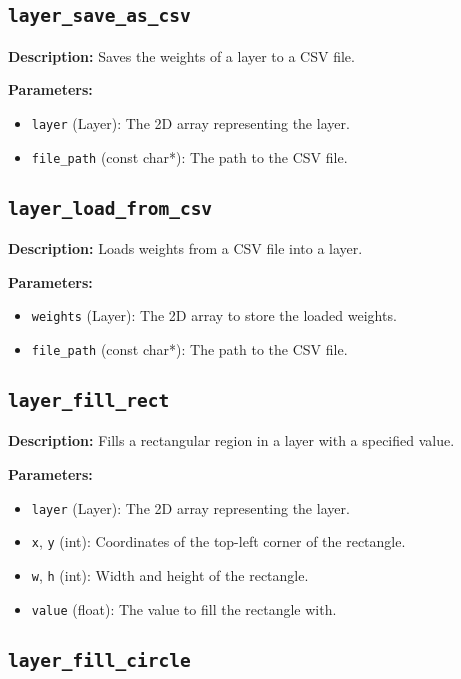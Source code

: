 \documentclass{article}
\begin{document}
\subsection*{\texttt{layer\_save\_as\_csv}}

\textbf{Description:} Saves the weights of a layer to a CSV file.

\textbf{Parameters:}
\begin{itemize}
    \item \texttt{layer} (Layer): The 2D array representing the layer.
    \item \texttt{file\_path} (const char*): The path to the CSV file.
\end{itemize}

\subsection*{\texttt{layer\_load\_from\_csv}}

\textbf{Description:} Loads weights from a CSV file into a layer.

\textbf{Parameters:}
\begin{itemize}
    \item \texttt{weights} (Layer): The 2D array to store the loaded weights.
    \item \texttt{file\_path} (const char*): The path to the CSV file.
\end{itemize}

\subsection*{\texttt{layer\_fill\_rect}}

\textbf{Description:} Fills a rectangular region in a layer with a specified value.

\textbf{Parameters:}
\begin{itemize}
    \item \texttt{layer} (Layer): The 2D array representing the layer.
    \item \texttt{x}, \texttt{y} (int): Coordinates of the top-left corner of the rectangle.
    \item \texttt{w}, \texttt{h} (int): Width and height of the rectangle.
    \item \texttt{value} (float): The value to fill the rectangle with.
\end{itemize}

\subsection*{\texttt{layer\_fill\_circle}}
\end{document}
